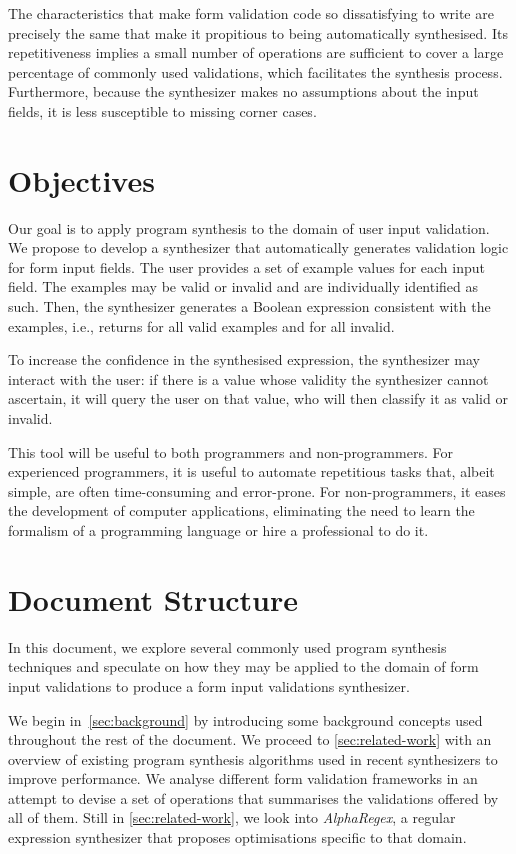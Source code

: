 The characteristics that make form validation code so dissatisfying to write are precisely the same that make it propitious to being automatically synthesised.
Its repetitiveness implies a small number of operations are sufficient to cover a large percentage of commonly used validations, which facilitates the synthesis process.
Furthermore, because the synthesizer makes no assumptions about the input fields, it is less susceptible to missing corner cases.

\section{Objectives}
Our goal is to apply program synthesis to the domain of user input validation. We propose to develop a synthesizer that automatically generates validation logic for form input fields.
The user provides a set of example values for each input field.
The examples may be valid or invalid and are individually identified as such.
Then, the synthesizer generates a Boolean expression consistent with the examples, i.e., returns \true{} for all valid examples and \false{} for all invalid.

To increase the confidence in the synthesised expression, the synthesizer may interact with the user: if there is a value whose validity the synthesizer cannot ascertain, it will query the user on that value, who will then classify it as valid or invalid.

This tool will be useful to both programmers and non-programmers.
For experienced programmers, it is useful to automate repetitious tasks that, albeit simple, are often time-consuming and error-prone.
For non-programmers, it eases the development of computer applications, eliminating the need to learn the formalism of a programming language or hire a professional to do it.

\section{Document Structure}

In this document, we explore several commonly used program synthesis techniques and speculate on how they may be applied to the domain of form input validations to produce a form input validations synthesizer.

We begin in~\autoref{sec:background} by introducing some background concepts used throughout the rest of the document.
We proceed to \autoref{sec:related-work} with an overview of existing program synthesis algorithms used in recent synthesizers to improve performance.
We analyse different form validation frameworks in an attempt to devise a set of operations that summarises the validations offered by all of them. Still in \autoref{sec:related-work}, we look into \textit{AlphaRegex}, a regular expression synthesizer that proposes optimisations specific to that domain.


